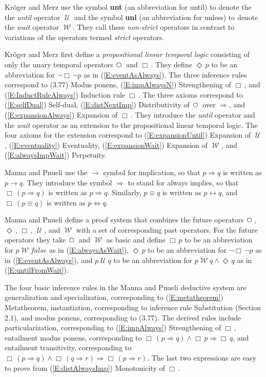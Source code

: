 \documentclass[12pt, fleqn, leqno]{article}
\newcommand{\impl}{\ensuremath{\Rightarrow}}        %
\newcommand{\Until}{\;\mathcal{U}\;}
\newcommand{\Wait}{\;\mathcal{W}\;}
\newcommand{\Next}{\;\,\text{\raisebox{3.5pt}{\circle{6}}}}
\newcommand{\Event}{\Diamond\,}
\newcommand{\Always}{\Box\,}
\begin{document}
Kröger and Merz \cite{Kroger} use the symbol \textbf{unt} (an abbreviation for until) to denote the the \textit{until} operator $\Until$ and the symbol \textbf{unl} (an abbreviation for unless) to denote the \textit{wait} operator $\Wait$.
They call these \textit{non-strict} operators in contrast to variations of the operators termed \textit{strict} operators.

Kröger and Merz first define a \textit{propositional linear temporal logic} consisting of only the unary temporal operators $\Next$ and $\Always$.
They define $\Event p$ to be an abbreviation for $\neg\Always\neg p$ as in (\ref{E:eventAsAlways}).
The three inference rules correspond to (3.77) Modus ponens, (\ref{E:impAlwaysN}) Strengthening of $\Always$, and (\ref{E:InductRuleAlways}) Induction rule $\Always$.
The three axioms correspond to (\ref{E:selfDual}) Self-dual, (\ref{E:distNextImp}) Distributivity of $\Next$ over $\impl$, and (\ref{E:expansionAlways}) Expansion of $\Always$.
They introduce the \textit{until} operator and the \textit{wait} operator as an extension to the propositional linear temporal logic.
The four axioms for the extension correspond to (\ref{E:expansionUntil}) Expansion of $\Until$, (\ref{E:eventuality}) Eventuality, (\ref{E:expansionWait}) Expansion of $\Wait$, and (\ref{E:alwaysImpWait}) Perpetuity.

Manna and Pnueli \cite{Manna} use the $\rightarrow$ symbol for implication, so that $p\impl q$ is written as $p\rightarrow q$.
They introduce the symbol $\impl$ to stand for always implies, so that $\Always(p\impl q)$ is written as $p\impl q$.
Similarly, $p\equiv q$ is written as $p\leftrightarrow q$, and $\Always(p\equiv q)$ is written as $p\Leftrightarrow q$.

Manna and Pnueli define a proof system that combines the future operators $\Next$, $\Event$, $\Always$, $\Until$, and $\Wait$ with a set of corresponding past operators.
For the future operators they take $\Next$ and $\Wait$ as basic and define $\Always p$ to be an abbreviation for $p\Wait false$ as in (\ref{E:alwaysAsWait}), $\Event p$ to be an abbreviation for $\neg\Always\neg p$ as in (\ref{E:eventAsAlways}), and $p\Until q$ to be an abbreviation for $p\Wait q \land \Event q$ as in (\ref{E:untilFromWait}).

The four basic inference rules in the Manna and Pnueli deductive system are generalization and specialization, corresponding to (\ref{E:metatheorem}) Metatheorem, instantiation, corresponding to inference rule Substitution (Section 2.1), and modus ponens, corresponding to (3.77).
The derived rules include particularization, corresponding to (\ref{E:impAlways}) Strengthening of $\Always$, entailment modus ponens, corresponding to $\Always(p\impl q)\land\Always p \impl \Always q$, and entailment transitivity, corresponding to $\Always(p\impl q)\land \Always(q\impl r) \impl \Always(p\impl r)$.
The last two expressions are easy to prove from (\ref{E:distAlwaysImp}) Monotonicity of $\Always$.
\end{document}
